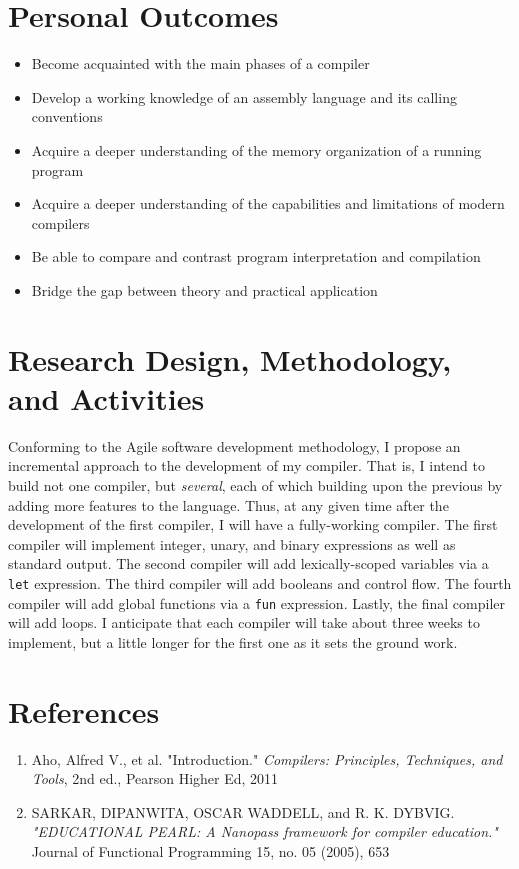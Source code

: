 \documentclass[12pt]{report}
\begin{document}
\section*{{\large Personal Outcomes}}
\begin{itemize}
	\item Become acquainted with the main phases of a compiler
	\item Develop a working knowledge of an assembly language and its calling conventions
	\item Acquire a deeper understanding of the memory organization of a running program
	\item Acquire a deeper understanding of the capabilities and limitations of modern compilers
	\item Be able to compare and contrast program interpretation and compilation
	\item Bridge the gap between theory and practical application
\end{itemize}

\section*{{\large Research Design, Methodology, and Activities}}
Conforming to the Agile software development methodology, I propose an incremental approach to the development of my compiler.  That is, I intend to build not one compiler, but \textit{several}, each of which building upon the previous by adding more features to the language.  Thus, at any given time after the development of the first compiler, I will have a fully-working compiler. The first compiler will implement integer, unary, and binary expressions as well as standard output.  The second compiler will add lexically-scoped variables via a \lstinline{let} expression.  The third compiler will add booleans and control flow.  The fourth compiler will add global functions via a \lstinline{fun} expression.  Lastly, the final compiler will add loops. I anticipate that each compiler will take about three weeks to implement, but a little longer for the first one as it sets the ground work.

\section*{{\large References}}
\begin{enumerate}
	\item[\text{[1]}] Aho, Alfred V., et al. "Introduction." \textit{Compilers: Principles, Techniques, and Tools}, 2nd ed., Pearson Higher Ed, 2011
	\item[\text{[2]}] SARKAR, DIPANWITA, OSCAR WADDELL, and R. K. DYBVIG. \textit{"EDUCATIONAL PEARL: A Nanopass framework for compiler education."} Journal of Functional Programming 15, no. 05 (2005), 653
\end{enumerate}
\end{document}
